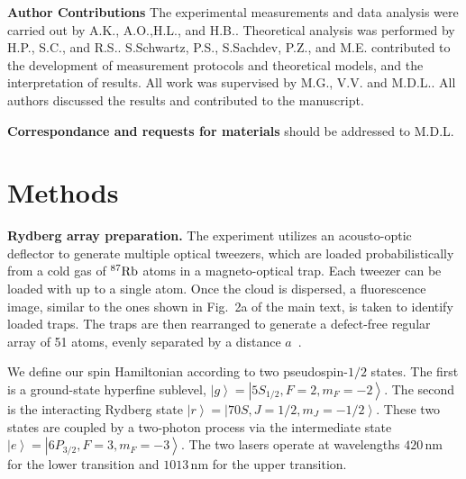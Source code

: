 \documentclass[prl,nobalancelastpage,superscriptaddress,twocolumn,nofootinbib]{revtex4}
\newcommand{\ket}[1]{\left|#1\right\rangle}
\newcommand{\Rb}{\ensuremath{^{87}{\rm Rb}}\xspace}
\begin{document}
\smallskip\noindent\textbf{Author Contributions}
The experimental measurements and data analysis were carried out by A.K., A.O.,H.L., and H.B..
Theoretical analysis was performed by H.P., S.C., and R.S..
S.Schwartz, P.S., S.Sachdev, P.Z., and M.E. contributed to the development of measurement protocols and theoretical models, and the interpretation of results.
All work was supervised by M.G., V.V. and M.D.L..
All authors discussed the results and contributed to the manuscript.

\smallskip\noindent\textbf{Correspondance and requests for materials} 
should be addressed to M.D.L.





\clearpage
\newpage

\setcounter{figure}{0}
\setcounter{table}{0}
\makeatletter 
\renewcommand{\thefigure}{Extended Data Fig. \@arabic\c@figure}
\renewcommand{\fnum@figure}{\textbf{Extended Data Figure \@arabic\c@figure}}
\renewcommand{\thetable}{Extended Data Table \@arabic\c@table}
\renewcommand{\fnum@table}{\textbf{Extended Data Table \@arabic\c@table}}
\makeatother




\section{Methods}

\noindent\textbf{Rydberg array preparation.} The experiment utilizes an acousto-optic deflector to generate multiple optical tweezers, which are loaded probabilistically from a cold gas of \Rb atoms in a magneto-optical trap. Each tweezer can be loaded with up to a single atom. Once the cloud is dispersed, a fluorescence image, similar to the ones shown in Fig.~2a of the main text, is taken to identify loaded traps. The traps are then rearranged to generate a defect-free regular array of 51 atoms, evenly separated by a distance $a$~\cite{Endres2016}.

We define our spin Hamiltonian according to two pseudospin-$1/2$ states. The first is a ground-state hyperfine sublevel, $\ket{g} = \ket{5S_{1/2}, F=2, m_F=-2}$. The second is the interacting Rydberg state ${\ket{r}=\ket{70S, J=1/2, m_J=-1/2}}$. These two states are coupled by a two-photon process via the intermediate state $\ket{e} = \ket{6P_{3/2}, F=3, m_F=-3}$. The two lasers operate at wavelengths $420\,$nm for the lower transition and $1013\,$nm for the upper transition.
\end{document}
